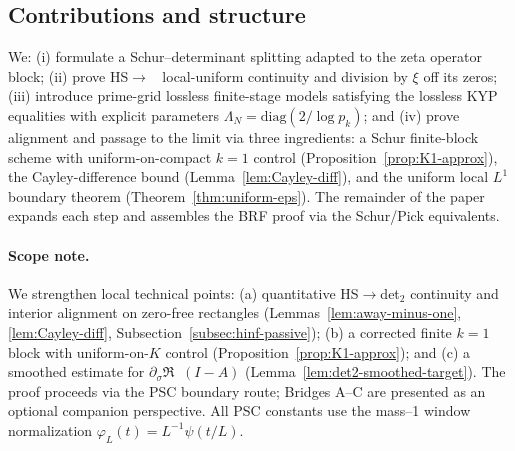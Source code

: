 \documentclass[11pt]{article}
\theoremstyle{definition}
\theoremstyle{remark}
\DeclareMathOperator{\dettwo}{det_2}
\begin{document}
\subsection*{Contributions and structure}
We: (i) formulate a Schur--determinant splitting adapted to the zeta operator block; (ii) prove HS\(\to\)\(\dettwo\) local-uniform continuity and division by \(\xi\) off its zeros; (iii) introduce prime-grid lossless finite-stage models satisfying the lossless KYP equalities with explicit parameters \(\Lambda_N=\mathrm{diag}(2/\log p_k)\); and (iv) prove alignment and passage to the limit via three ingredients: a Schur finite-block scheme with uniform-on-compact $k=1$ control (Proposition~\ref{prop:K1-approx}), the Cayley-difference bound (Lemma~\ref{lem:Cayley-diff}), and the uniform local \(L^1\) boundary theorem (Theorem~\ref{thm:uniform-eps}). The remainder of the paper expands each step and assembles the BRF proof via the Schur/Pick equivalents.
\paragraph{Scope note.} We strengthen local technical points: (a) quantitative HS$\to$det$_2$ continuity and interior alignment on zero-free rectangles (Lemmas~\ref{lem:away-minus-one}, \ref{lem:Cayley-diff}, Subsection~\ref{subsec:hinf-passive}); (b) a corrected finite $k{=}1$ block with uniform-on-$K$ control (Proposition~\ref{prop:K1-approx}); and (c) a smoothed estimate for $\partial_\sigma\Re\dettwo(I-A)$ (Lemma~\ref{lem:det2-smoothed-target}). The proof proceeds via the PSC boundary route; Bridges A--C are presented as an optional companion perspective. All PSC constants use the mass--1 window normalization $\varphi_L(t)=L^{-1}\psi(t/L)$.
\end{document}
